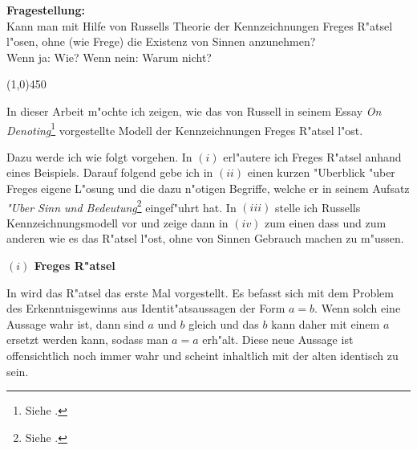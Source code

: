\documentclass[a4paper, emulatestandardclasses, 12pt]{scrartcl}
\begin{document}
\begin{onehalfspace} 

\noindent\textbf{Fragestellung:}\\
\indent Kann man mit Hilfe von Russells Theorie der Kennzeichnungen Freges R"atsel l"osen, ohne (wie Frege) die Existenz von Sinnen anzunehmen?\\\indent Wenn ja: Wie? Wenn nein: Warum nicht?

\begin{center}
\vspace{-9pt}\line(1,0){450}
\end{center}


\noindent In dieser Arbeit m"ochte ich zeigen, wie das von Russell in seinem Essay \emph{On Denoting}\footnote{Siehe \citep*{russell1905denoting}.} vorgestellte Modell der Kennzeichnungen Freges R"atsel l"ost. %

Dazu werde ich wie folgt vorgehen. In $(i)$ erl"autere ich Freges R"atsel anhand eines Beispiels. Darauf folgend gebe ich in $(ii)$ einen kurzen "Uberblick "uber Freges eigene L"osung und die dazu n"otigen Begriffe, welche er in seinem Aufsatz \emph{"Uber Sinn und Bedeutung}\footnote{Siehe \citep{sinnundbedeutung}.} eingef"uhrt hat. In $(iii)$ stelle ich Russells Kennzeichnungsmodell vor und zeige dann in $(iv)$ zum einen dass und zum anderen wie es das R"atsel l"ost, ohne von Sinnen Gebrauch machen zu m"ussen. %
\vspace{5mm}

\noindent\textbf{$(i)$ Freges R"atsel}

\noindent In \citep{sinnundbedeutung} wird das R"atsel das erste Mal vorgestellt. Es befasst sich mit dem Problem des Erkenntnisgewinns aus Identit"atsaussagen der Form $a = b$. Wenn solch eine Aussage wahr ist, dann sind $a$ und $b$ gleich und das $b$ kann daher mit einem $a$ ersetzt werden kann, sodass man $a = a$ erh"alt. Diese neue Aussage ist offensichtlich noch immer wahr und scheint inhaltlich mit der alten identisch zu sein.


\end{onehalfspace}
\end{document}
